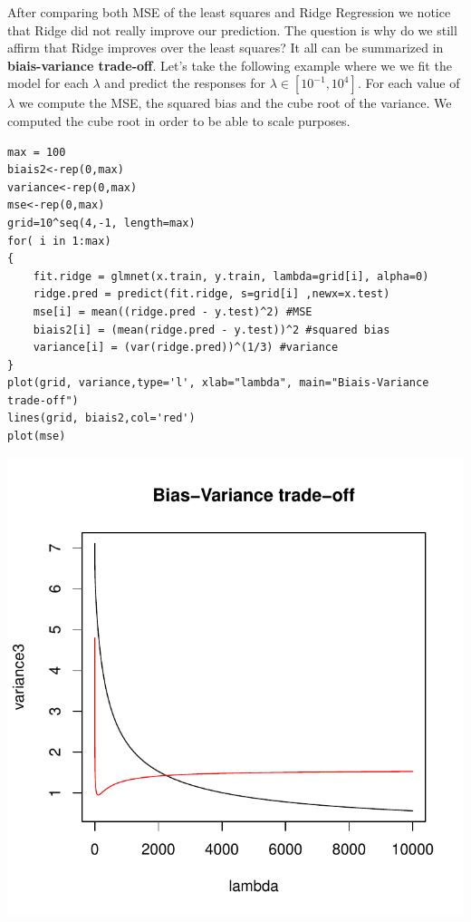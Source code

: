 \documentclass[]{report}
\begin{document}
After comparing both MSE of the least squares and Ridge Regression we notice that Ridge did not really improve our prediction. The question is why do we still affirm that Ridge improves over the least squares? It all can be summarized in\textbf{ biais-variance trade-off}. Let's take the following example where we we fit the model for each $\lambda$ and predict the responses for $\lambda\in[10^{-1},10^{4}]$. For each value of $\lambda$ we compute the MSE, the squared bias and the cube root of the variance. We computed the cube root in order to be able to scale purposes.
\begin{lstlisting}
max = 100
biais2<-rep(0,max)
variance<-rep(0,max) 
mse<-rep(0,max)
grid=10^seq(4,-1, length=max)
for( i in 1:max)
{     
	fit.ridge = glmnet(x.train, y.train, lambda=grid[i], alpha=0)
	ridge.pred = predict(fit.ridge, s=grid[i] ,newx=x.test)
	mse[i] = mean((ridge.pred - y.test)^2) #MSE
	biais2[i] = (mean(ridge.pred - y.test))^2 #squared bias
	variance[i] = (var(ridge.pred))^(1/3) #variance
}
plot(grid, variance,type='l', xlab="lambda", main="Biais-Variance trade-off")
lines(grid, biais2,col='red')
plot(mse)
\end{lstlisting}

\begin{center}
	\includegraphics{Figures/ridge_biais_var.pdf}
\end{center}
\end{document}
